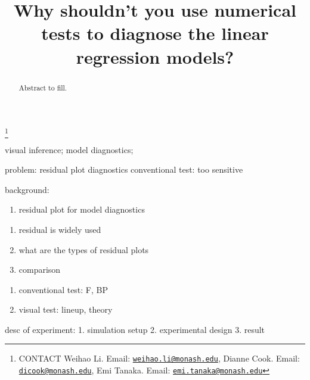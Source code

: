 \documentclass[]{interact}
\theoremstyle{plain}%
\theoremstyle{definition}
\theoremstyle{remark}
\def\tightlist{}
\begin{document}

\title{Why shouldn't you use numerical tests to diagnose the linear
regression models?}


\author{
}

\thanks{CONTACT Weihao
Li. Email: \href{mailto:weihao.li@monash.edu}{\nolinkurl{weihao.li@monash.edu}}, Dianne
Cook. Email: \href{mailto:dicook@monash.edu}{\nolinkurl{dicook@monash.edu}}, Emi
Tanaka. Email: \href{mailto:emi.tanaka@monash.edu}{\nolinkurl{emi.tanaka@monash.edu}}}

\maketitle

\begin{abstract}
Abstract to fill.
\end{abstract}

\begin{keywords}
visual inference; model diagnostics;
\end{keywords}

problem: residual plot diagnostics conventional test: too sensitive

background:

\begin{enumerate}
\def\labelenumi{\arabic{enumi}.}
\tightlist
\item
  residual plot for model diagnostics
\end{enumerate}

\begin{enumerate}
\def\labelenumi{\alph{enumi}.}
\tightlist
\item
  residual is widely used
\item
  what are the types of residual plots
\item
  comparison
\end{enumerate}

\begin{enumerate}
\def\labelenumi{\arabic{enumi}.}
\setcounter{enumi}{1}
\tightlist
\item
  conventional test: F, BP
\item
  visual test: lineup, theory
\end{enumerate}

desc of experiment: 1. simulation setup 2. experimental design 3. result
\end{document}
